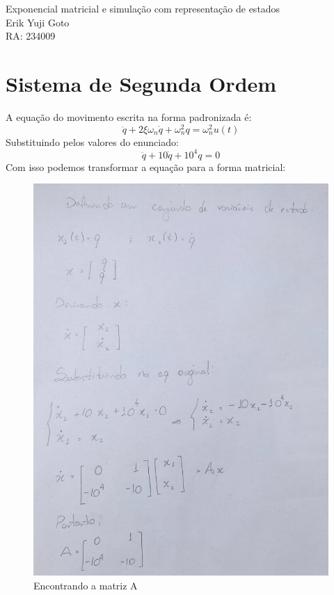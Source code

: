 \documentclass[a4paper, 12pt]{article}
\begin{document}
	\begin{center} %
		{\Large Exponencial matricial e simulação com representação de estados}\\[0.4cm]
		{\large Erik Yuji Goto}\\[0.2cm]
		{\normalsize RA: 234009}
	\end{center} %

\section{Sistema de Segunda Ordem}
	A equação do movimento escrita na forma padronizada é:	
	\begin{equation}
		\ddot{q} + 2\xi \omega_n \dot{q} + \omega_n^2q = \omega_n^2u(t)
	\end{equation}
	Substituindo pelos valores do enunciado:	
	\begin{equation}
		\ddot{q} + 10\dot{q} + 10^4q = 0
	\end{equation}
	Com isso podemos transformar a equação para a forma matricial:
	\begin{figure}[h]
		\centering
		\includegraphics[scale=0.35]{imagens/a1.jpg}
		\caption{Encontrando a matriz A}
	\end{figure}
\end{document}
